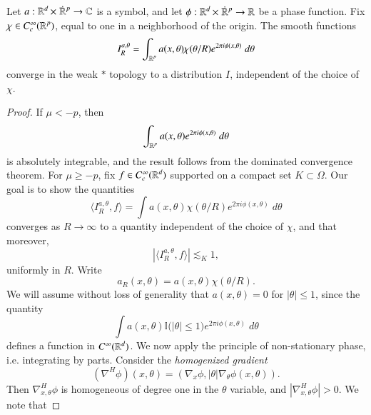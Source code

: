 \begin{theorem}
    Let $a: \RR^d \times\; \dot{\RR}{\vphantom{\RR}}^p \to \CC$ is a symbol, and let $\phi: \RR^d \times\; \dot{\RR}{\vphantom{\RR}}^p \to \RR$ be a phase function. Fix $\chi \in C_c^\infty(\operatorname{\mathbb{R}}^p)$, equal to one in a neighborhood of the origin. The smooth functions
    \[ I^{a,\theta}_R = \int_{\operatorname{\mathbb{R}}^p} a(x,\theta) \chi(\theta / R) e^{2 \pi i \phi(x,\theta)}\; d\theta \]
    converge in the weak $*$ topology to a distribution $I$, independent of the choice of $\chi$. 
\end{theorem}
\begin{proof}
    If $\mu < -p$, then
    \begin{equation}
        \int_{\operatorname{\mathbb{R}}^p} a(x,\theta) e^{2 \pi i \phi(x,\theta)}\; d\theta
    \end{equation}
    is absolutely integrable, and the result follows from the dominated convergence theorem. For $\mu \geq -p$, fix $f \in C_c^\infty(\operatorname{\mathbb{R}}^d)$ supported on a compact set $K \subset \Omega$. Our goal is to show the quantities
    \begin{equation}
        \langle I^{a,\theta}_R, f \rangle = \int a(x,\theta) \chi(\theta / R) e^{2 \pi i \phi(x,\theta)}\; d\theta
    \end{equation}
    converges as $R \to \infty$ to a quantity independent of the choice of $\chi$, and that moreover,
    \begin{equation}
        |\langle I^{a,\theta}_R, f \rangle| \lesssim_K 1,
    \end{equation}
    uniformly in $R$. Write
    \begin{equation}
        a_R(x,\theta) = a(x, \theta) \chi(\theta / R).
    \end{equation}
    We will assume without loss of generality that $a(x,\theta) = 0$ for $|\theta| \leq 1$, since the quantity
    \begin{equation}
        \int a(x,\theta) \mathbb{I} \big(|\theta| \leq 1 \big) e^{2 \pi i \phi(x,\theta)}\; d\theta
    \end{equation}
    defines a function in $C^\infty(\operatorname{\mathbb{R}}^d)$. We now apply the principle of non-stationary phase, i.e. integrating by parts. Consider the \emph{homogenized gradient}
    \begin{equation}
        (\nabla^H\! \phi)(x,\theta) = ( \nabla_x \phi, |\theta| \nabla_\theta \phi(x,\theta) ).
    \end{equation}
    Then $\nabla_{x,\theta}^H \phi$ is homogeneous of degree one in the $\theta$ variable, and $|\nabla_{x,\theta}^H \phi| > 0$. We note that

\end{proof}
